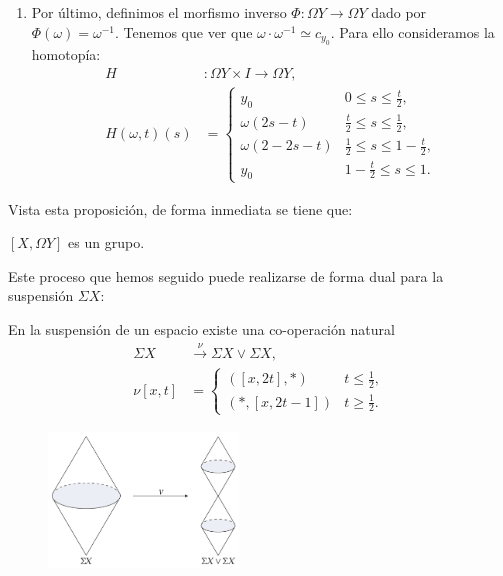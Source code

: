 \begin{demo}
\begin{enumerate}
\item Por último, definimos el morfismo inverso $\varPhi : \Omega Y \longrightarrow \Omega Y $ dado por $\varPhi(\omega) = \omega^{-1}$. Tenemos que ver que $\omega \cdotp \omega^{-1} \simeq c_{y_0}$. Para ello consideramos la homotopía:
\begin{align*}
H &: \Omega Y \times I \longrightarrow \Omega Y, \\
H(\omega, t)(s) &= 
\begin{cases}
y_0 & 0 \leq s \leq \frac{t}{2}, \\
\omega(2s - t) & \frac{t}{2} \leq s \leq \frac{1}{2}, \\
\omega(2 - 2s - t) & \frac{1}{2} \leq s \leq 1 - \frac{t}{2}, \\
y_0 & 1 - \frac{t}{2} \leq s \leq 1.
\end{cases}
\end{align*}
\end{enumerate}
\end{demo}
Vista esta proposición, de forma inmediata se tiene que:
\begin{teorf}
$[X, \Omega Y]$ es un grupo.
\end{teorf}
Este proceso que hemos seguido puede realizarse de forma dual para la suspensión $\Sigma X$:\par
En la suspensión de un espacio existe una co-operación natural
\begin{align*}
\Sigma X &\stackrel{\nu}{\longrightarrow} \Sigma X \vee \Sigma X, \\
\nu [x, t] &= 
\begin{cases}
([x, 2t], \ast ) & t \leq \frac{1}{2}, \\
( \ast, [x, 2t -1]) & t \geq \frac{1}{2}.
\end{cases}
\end{align*}
\begin{figure}[h]
\centering
\includegraphics[width=0.45\textwidth]{images/suspoperac.pdf}
\end{figure}

